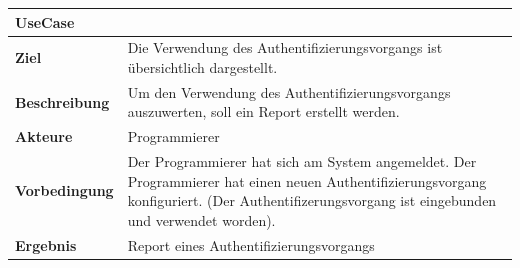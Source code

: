 \begin{longtable}[c]{@{}ll@{}}
\toprule
\begin{minipage}[b]{0.34\columnwidth}\raggedright\strut
\textbf{UseCase}
\strut\end{minipage} &
\begin{minipage}[b]{0.60\columnwidth}\raggedright\strut
\strut\end{minipage}\tabularnewline
\midrule
\endhead
\begin{minipage}[t]{0.34\columnwidth}\raggedright\strut
\textbf{Ziel}
\strut\end{minipage} &
\begin{minipage}[t]{0.60\columnwidth}\raggedright\strut
Die Verwendung des Authentifizierungsvorgangs ist übersichtlich
dargestellt.
\strut\end{minipage}\tabularnewline
\begin{minipage}[t]{0.34\columnwidth}\raggedright\strut
\textbf{Beschreibung}
\strut\end{minipage} &
\begin{minipage}[t]{0.60\columnwidth}\raggedright\strut
Um den Verwendung des Authentifizierungsvorgangs auszuwerten, soll ein
Report erstellt werden.
\strut\end{minipage}\tabularnewline
\begin{minipage}[t]{0.34\columnwidth}\raggedright\strut
\textbf{Akteure}
\strut\end{minipage} &
\begin{minipage}[t]{0.60\columnwidth}\raggedright\strut
Programmierer
\strut\end{minipage}\tabularnewline
\begin{minipage}[t]{0.34\columnwidth}\raggedright\strut
\textbf{Vorbedingung}
\strut\end{minipage} &
\begin{minipage}[t]{0.60\columnwidth}\raggedright\strut
Der Programmierer hat sich am System angemeldet. Der Programmierer hat
einen neuen Authentifizierungsvorgang konfiguriert. (Der
Authentifizerungsvorgang ist eingebunden und verwendet worden).
\strut\end{minipage}\tabularnewline
\begin{minipage}[t]{0.34\columnwidth}\raggedright\strut
\textbf{Ergebnis}
\strut\end{minipage} &
\begin{minipage}[t]{0.60\columnwidth}\raggedright\strut
Report eines Authentifizierungsvorgangs
\strut\end{minipage}\tabularnewline

\end{longtable}

